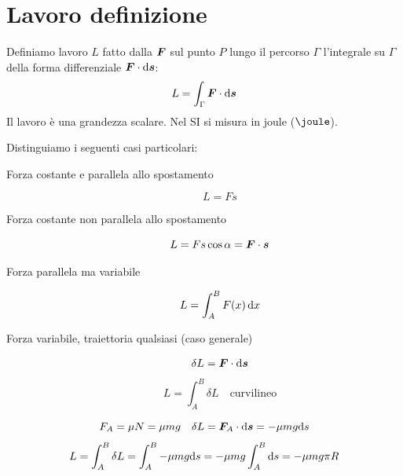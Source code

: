 \section{Lavoro definizione}
\begin{Def}[lavoro]
Definiamo lavoro $L$ fatto dalla $\boldsymbol{F}$ sul punto $P$ lungo il percorso $\Gamma$ l'integrale su $\Gamma$ della forma differenziale $\boldsymbol{F}\cdot\mathrm{d}\boldsymbol{s}$:
\begin{equation}
L=\int_\Gamma\boldsymbol{F}\cdot\mathrm{d} \boldsymbol{s}
\end{equation}
Il lavoro è una grandezza scalare. Nel SI si misura in joule ($\joule$).
\end{Def}
Distinguiamo i seguenti casi particolari:
\begin{description}
\item[Forza costante e parallela allo spostamento]
\begin{equation*}L=Fs\end{equation*}
\item[Forza costante non parallela allo spostamento]
\begin{equation*}L=Fs\cos\alpha=\boldsymbol{F} \cdot \boldsymbol{s}\end{equation*}
\item[Forza parallela ma variabile]
\begin{equation*}L=\int_A^B F(x)\,\mathrm{d} x\end{equation*}
\item[Forza variabile, traiettoria qualsiasi (caso generale)]
\begin{equation*}\delta L=\boldsymbol{F}\cdot\mathrm{d} \boldsymbol{s}\end{equation*}
\begin{equation*}{L=\int_A^B\delta L \quad \text{curvilineo}}\end{equation*}
\end{description}
\begin{Es}
\begin{equation*}F_A=\mu N=\mu mg\quad \delta L=\boldsymbol{F}_A\cdot\mathrm{d} \boldsymbol{s}=-\mu mg\mathrm{d} s\end{equation*}
\begin{equation*}L=\int_A^B \delta L=\int_A^B -\mu mg\mathrm{d} s=-\mu mg\int_A^B\mathrm{d}
s=-\mu mg\pi R\end{equation*}
\end{Es}
